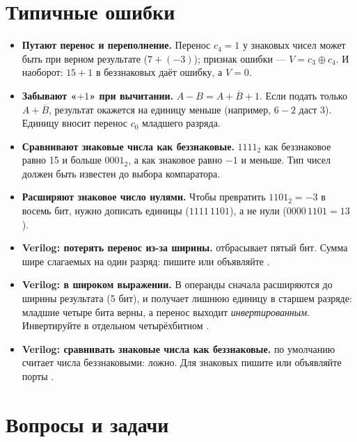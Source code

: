 \section{Типичные ошибки}

\begin{warnbox}
\begin{itemize}
  \item \textbf{Путают перенос и переполнение.} Перенос $c_4=1$ у знаковых чисел может быть при верном результате ($7+(-3)$); признак ошибки --- $V=c_3\oplus c_4$. И наоборот: $15+1$ в беззнаковых даёт ошибку, а $V=0$.
  \item \textbf{Забывают «$+1$» при вычитании.} $A-B=A+\overline{B}+1$. Если подать только $A+\overline{B}$, результат окажется на единицу меньше (например, $6-2$ даст 3). Единицу вносит перенос $c_0$ младшего разряда.
  \item \textbf{Сравнивают знаковые числа как беззнаковые.} $1111_2$ как беззнаковое равно 15 и больше $0001_2$, а как знаковое равно $-1$ и меньше. Тип чисел должен быть известен до выбора компаратора.
  \item \textbf{Расширяют знаковое число нулями.} Чтобы превратить $1101_2=-3$ в восемь бит, нужно дописать единицы ($1111\,1101$), а не нули ($0000\,1101=13$).
  \item \textbf{Verilog: потерять перенос из-за ширины.}
     отбрасывает пятый бит. Сумма шире слагаемых на
    один разряд: пишите  или объявляйте
    \code{[4:0]}.
  \item \textbf{Verilog:  в широком выражении.} В
     операнды сначала
    расширяются до ширины результата (5 бит), и  получает
    лишнюю единицу в старшем разряде: младшие четыре бита верны, а перенос
     выходит \emph{инвертированным}. Инвертируйте в отдельном
    четырёхбитном .
  \item \textbf{Verilog: сравнивать знаковые числа как беззнаковые.}
     по умолчанию считает числа беззнаковыми:  ложно. Для знаковых пишите  или
    объявляйте порты .
\end{itemize}
\end{warnbox}

\section{Вопросы и задачи}
\label{sec:tasks-arith}


